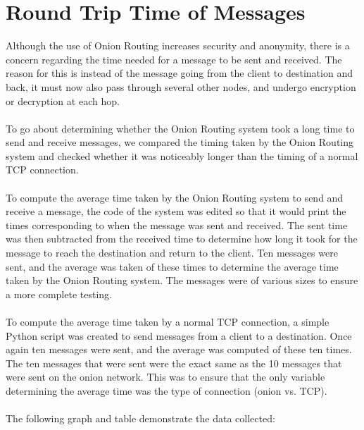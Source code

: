 \documentclass[10pt]{report}
\begin{document}
\section{Round Trip Time of Messages}
Although the use of Onion Routing increases security and anonymity, there is a concern regarding the
time needed for a message to be sent and received. The reason for this is instead of the message
going from the client to destination and back, it must now also pass through several other nodes,
and undergo encryption or decryption at each hop.\\\\
To go about determining whether the Onion Routing system took a long time to
send and receive messages, we compared the timing taken by the Onion Routing system and checked
whether it was noticeably longer than the timing of a normal TCP connection.\\\\
To compute the
average time taken by the Onion Routing system to send and receive a message, the code of the system
was edited so that it would print the times corresponding to when the message was sent and received.
The sent time was then subtracted from the received time to determine how long it took for the
message to reach the destination and return to the client. Ten messages were sent, and the average
was taken of these times to determine the average time taken by the Onion Routing system. The
messages were of various sizes to ensure a more complete testing.\\\\
To compute the average time
taken by a normal TCP connection, a simple Python script was created to send messages from a client
to a destination. Once again ten messages were sent, and the average was computed of these ten
times. The ten messages that were sent were the exact same as the 10 messages that were sent on the
onion network. This was to ensure that the only variable determining the average time was the type
of connection (onion vs. TCP).\\\\
The following graph and table demonstrate the data collected:
\end{document}
